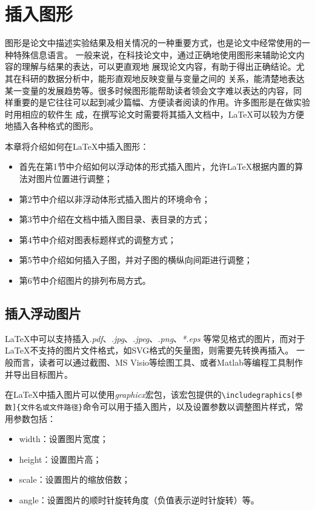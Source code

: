 \chapter{插入图形}

图形是论文中描述实验结果及相关情况的一种重要方式，也是论文中经常使用的一种特殊信息语言。
一般来说，在科技论文中，通过正确地使用图形来辅助论文内容的理解与结果的表达，可以更直观地
展现论文内容，有助于得出正确结论。尤其在科研的数据分析中，能形直观地反映变量与变量之间的
关系，能清楚地表达某一变量的发展趋势等。很多时候图形能帮助读者领会文字难以表达的内容，同
样重要的是它往往可以起到减少篇幅、方便读者阅读的作用。许多图形是在做实验时用相应的软件生
成，在撰写论文时需要将其插入文档中，LaTeX可以较为方便地插入各种格式的图形。

本章将介绍如何在LaTeX中插入图形：
\begin{itemize}
    \item 首先在第1节中介绍如何以浮动体的形式插入图片，允许LaTeX根据内置的算法对图片位置进行调整；
    \item 第2节中介绍以非浮动体形式插入图片的环境命令；
    \item 第3节中介绍在文档中插入图目录、表目录的方式；
    \item 第4节中介绍对图表标题样式的调整方式；
    \item 第5节中介绍如何插入子图，并对子图的横纵向间距进行调整；
    \item 第6节中介绍图片的排列布局方式。
\end{itemize}

\section{插入浮动图片}

LaTeX中可以支持插入\emph{.pdf}、\emph{.jpg}、\emph{.jpeg}、\emph{.png}、\emph{*.eps}
等常见格式的图片，而对于LaTeX不支持的图片文件格式，如SVG格式的矢量图，则需要先转换再插入。
一般而言，读者可以通过截图、MS Visio等绘图工具、或者Matlab等编程工具制作并导出目标图片。

在LaTeX中插入图片可以使用\emph{graphicx}宏包，该宏包提供的\texttt{\textbackslash{}includegraphics[参数]\{文件名或文件路径\}}命令可以用于插入图片，以及设置参数以调整图片样式，常用参数包括：
\begin{itemize}
    \item width：设置图片宽度；
    \item height：设置图片高；
    \item scale：设置图片的缩放倍数；
    \item angle：设置图片的顺时针旋转角度（负值表示逆时针旋转）等。
\end{itemize}

